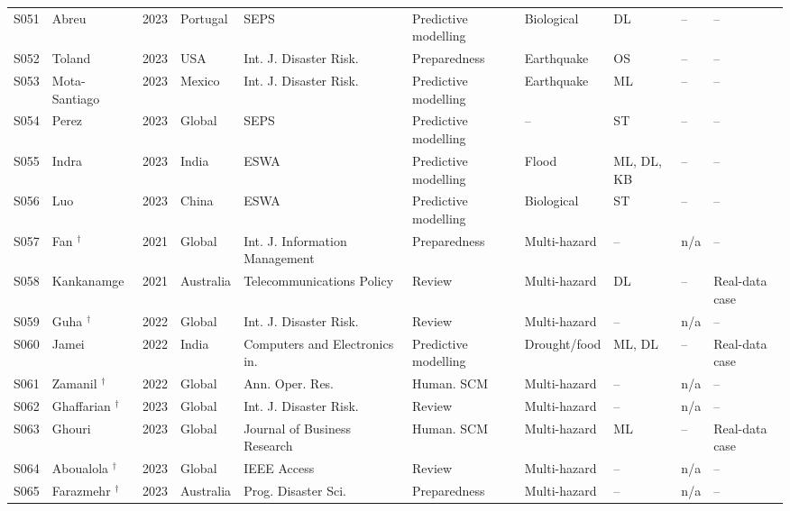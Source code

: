\begin{landscape}
\begin{longtable}{@{}p{1.0cm}p{3.3cm}p{0.8cm}p{2.3cm}p{3.1cm}p{2.6cm}p{2.2cm}p{1.9cm}p{2.3cm}p{2.2cm}@{}}
S051 & Abreu \cite{Abreu2023Data-drivenServices} & 2023 & Portugal & SEPS & Predictive modelling & Biological & DL & -- & -- \\
S052 & Toland \cite{Toland2023ADisasters} & 2023 & USA & Int. J. Disaster Risk. & Preparedness & Earthquake & OS & -- & -- \\
S053 & Mota-Santiago \cite{Mota-Santiago2023DeterminationCountriesc} & 2023 & Mexico & Int. J. Disaster Risk. & Predictive modelling & Earthquake & ML & -- & -- \\
S054 & Perez \cite{Perez2023AnalysisDisasters} & 2023 & Global & SEPS & Predictive modelling & -- & ST & -- & -- \\
S055 & Indra \cite{Indra2023AnCGDNN} & 2023 & India & ESWA & Predictive modelling & Flood & ML, DL, KB & -- & -- \\
S056 & Luo \cite{Luo2023RecursivePerception} & 2023 & China & ESWA & Predictive modelling & Biological & ST & -- & -- \\
S057 & Fan \cite{Fan2021DisasterManagement}$^{\dagger}$ & 2021 & Global & Int. J. Information Management & Preparedness & Multi-hazard & -- & n/a & -- \\
S058 & Kankanamge \cite{Kankanamge2021PublicBrisbane} & 2021 & Australia & Telecommunications Policy & Review & Multi-hazard & DL & -- & Real-data case \\
S059 & Guha \cite{Guha2022ArtificialReview}$^{\dagger}$ & 2022 & Global & Int. J. Disaster Risk. & Review & Multi-hazard & -- & n/a & -- \\
S060 & Jamei \cite{Jamei2022CombinedSelection} & 2022 & India & Computers and Electronics in. & Predictive modelling & Drought/food & ML, DL & -- & Real-data case \\
S061 & Zamanil \cite{Zamani2023ArtificialReview}$^{\dagger}$ & 2022 & Global & Ann. Oper. Res. & Human. SCM & Multi-hazard & -- & n/a & -- \\
S062 & Ghaffarian \cite{Ghaffarian2023ExplainableFutures}$^{\dagger}$ & 2023 & Global & Int. J. Disaster Risk. & Review & Multi-hazard & -- & n/a & -- \\
S063 & Ghouri \cite{Ghouri2023AnDevelopment} & 2023 & Global & Journal of Business Research & Human. SCM & Multi-hazard & ML & -- & Real-data case \\
S064 & Aboualola \cite{Aboualola2023EdgeIntegration}$^{\dagger}$ & 2023 & Global & IEEE Access & Review & Multi-hazard & -- & n/a & -- \\
S065 & Farazmehr \cite{Farazmehr2023LocatingReview}$^{\dagger}$ & 2023 & Australia & Prog. Disaster Sci. & Preparedness & Multi-hazard & -- & n/a & -- \\

\end{longtable}
\end{landscape}
